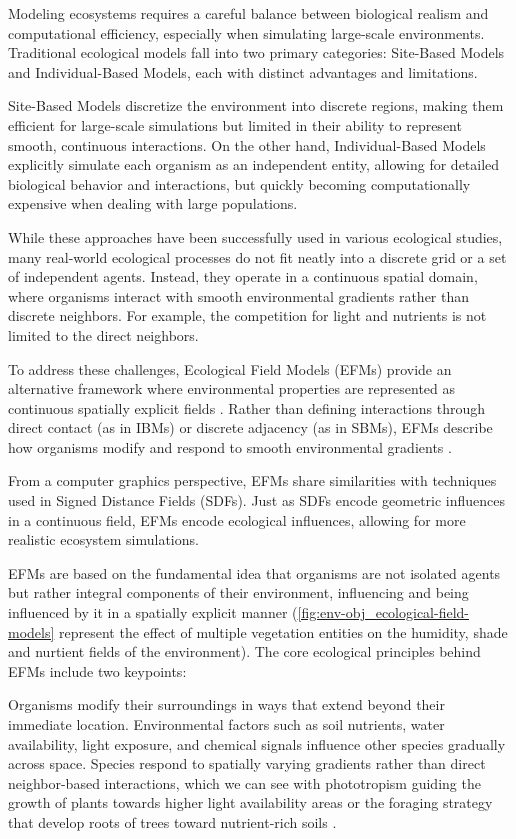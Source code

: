 Modeling ecosystems requires a careful balance between biological realism and computational efficiency, especially when simulating large-scale environments. Traditional ecological models fall into two primary categories: Site-Based Models and Individual-Based Models, each with distinct advantages and limitations.

Site-Based Models discretize the environment into discrete regions, making them efficient for large-scale simulations but limited in their ability to represent smooth, continuous interactions. On the other hand, Individual-Based Models explicitly simulate each organism as an independent entity, allowing for detailed biological behavior and interactions, but quickly becoming computationally expensive when dealing with large populations.

While these approaches have been successfully used in various ecological studies, many real-world ecological processes do not fit neatly into a discrete grid or a set of independent agents. Instead, they operate in a continuous spatial domain, where organisms interact with smooth environmental gradients rather than discrete neighbors. For example, the competition for light and nutrients is not limited to the direct neighbors.

To address these challenges, Ecological Field Models (EFMs) provide an alternative framework where environmental properties are represented as continuous spatially explicit fields \cite{Wu1985}. Rather than defining interactions through direct contact (as in IBMs) or discrete adjacency (as in SBMs), EFMs describe how organisms modify and respond to smooth environmental gradients \cite{Chng2011b,Seidl2012}.

From a computer graphics perspective, EFMs share similarities with techniques used in Signed Distance Fields (SDFs). Just as SDFs encode geometric influences in a continuous field, EFMs encode ecological influences, allowing for more realistic ecosystem simulations.

EFMs are based on the fundamental idea that organisms are not isolated agents but rather integral components of their environment, influencing and being influenced by it in a spatially explicit manner (\cref{fig:env-obj_ecological-field-models} represent the effect of multiple vegetation entities on the humidity, shade and nurtient fields of the environment). The core ecological principles behind EFMs include two keypoints:
\begin{Itemize}
     Organisms modify their surroundings in ways that extend beyond their immediate location.    Environmental factors such as soil nutrients, water availability, light exposure, and chemical signals influence other species gradually across space.
     Species respond to spatially varying gradients rather than direct neighbor-based interactions, which we can see with phototropism guiding the growth of plants towards higher light availability areas \cite{Pirk2012} or the foraging strategy that develop roots of trees toward nutrient-rich soils \cite{Li2023}. 
\end{Itemize}

